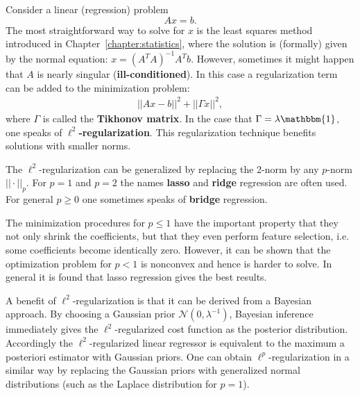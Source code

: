     \begin{method}{
        Consider a linear (regression) problem \[Ax = b.\] The most straightforward way to solve for $x$ is the least squares method introduced in Chapter~\ref{chapter:statistics}, where the solution is (formally) given by the normal equation: $x=(A^TA)^{-1}A^Tb$. However, sometimes it might happen that $A$ is nearly singular (\textbf{ill-conditioned}). In this case a regularization term can be added to the minimization problem:
        \begin{gather}
            ||Ax-b||^2+||\Gamma x||^2,
        \end{gather}
        where $\Gamma$ is called the \textbf{Tikhonov matrix}. In the case that $\Gamma=\lambda\mathbbm{1}$, one speaks of \textbf{$\ell^2$-regularization}. This regularization technique benefits solutions with smaller norms.
    }
    \end{method}
    \begin{remark}
        The $\ell^2$-regularization can be generalized by replacing the 2-norm by any $p$-norm $||\cdot||_p$. For $p=1$ and $p=2$ the names \textbf{lasso} and \textbf{ridge} regression are often used. For general $p\geq0$ one sometimes speaks of \textbf{bridge} regression.

        The minimization procedures for $p\leq1$ have the important property that they not only shrink the coefficients, but that they even perform feature selection, i.e. some coefficients become identically zero. However, it can be shown that the optimization problem for $p<1$ is nonconvex and hence is harder to solve. In general it is found that lasso regression gives the best results.

        A benefit of $\ell^2$-regularization is that it can be derived from a Bayesian approach. By choosing a Gaussian prior $\mathcal{N}(0, \lambda^{-1})$, Bayesian inference immediately gives the $\ell^2$-regularized cost function as the posterior distribution. Accordingly the $\ell^2$-regularized linear regressor is equivalent to the maximum a posteriori estimator with Gaussian priors. One can obtain $\ell^p$-regularization in a similar way by replacing the Gaussian priors with generalized normal distributions (such as the Laplace distribution for $p=1$).
    \end{remark}

